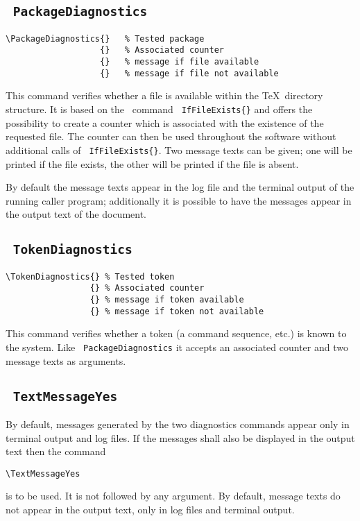 \documentclass[10pt,a4paper]{article}
\begin{document}
\subsection{\texttt{ PackageDiagnostics}}

\begin{verbatim}
\PackageDiagnostics{}	% Tested package
                   {}	% Associated counter
                   {}	% message if file available
                   {}	% message if file not available
\end{verbatim}

This command verifies whether a file is available within the \TeX\
directory structure. It is based on the \LaTeXe\ command
\texttt{ IfFileExists\{\}} and offers the possibility to
create a counter which is associated with the existence of the
requested file. The counter can then be used throughout the software
without additional calls of \texttt{\char92 IfFileExists\{\}}.
Two message texts can be given; one will be printed if the file
exists, the other will be printed if the file is absent.

By default the message texts appear in the log file and the terminal
output of the running caller program; additionally it is possible to
have the messages appear in the output text of the document.

\subsection{\texttt{ TokenDiagnostics}}

\begin{verbatim}
\TokenDiagnostics{}	% Tested token
                 {}	% Associated counter
                 {}	% message if token available
                 {}	% message if token not available
\end{verbatim}

This command verifies whether a token (a command sequence, etc.)
is known to the system. Like \texttt{\char92 PackageDiagnostics}
it accepts an associated counter and two message texts as arguments.

\subsection{\texttt{ TextMessageYes}}

By default, messages generated by the two diagnostics commands
appear only in terminal output and log files. If the messages shall
also be displayed in the output text then the command 
\begin{verbatim}
\TextMessageYes
\end{verbatim}
is to be used. It is not followed by any argument. By default,
message texts do not appear in the output text, only in log files
and terminal output.
\end{document}

